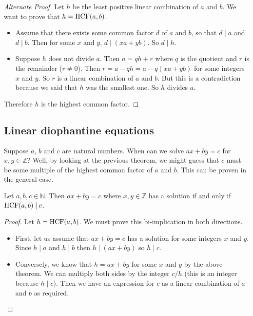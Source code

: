 \begin{proof}[Alternate Proof]
	Let \(h\) be the least positive linear combination of \(a\) and \(b\).
	We want to prove that \(h = \operatorname{HCF} (a, b)\).
	\begin{itemize}
		\item Assume that there exists some common factor \(d\) of \(a\) and \(b\), so that \(d\mid a\) and \(d\mid b\).
		      Then for some \(x\) and \(y\), \(d \mid (xa + yb)\).
		      So \(d \mid h\).
		\item Suppose \(h\) does not divide \(a\).
		      Then \(a = qh + r\) where \(q\) is the quotient and \(r\) is the remainder (\(r \neq 0\)).
		      Then \(r = a - qh = a - q(xa + yb)\) for some integers \(x\) and \(y\).
		      So \(r\) is a linear combination of \(a\) and \(b\).
		      But this is a contradiction because we said that \(h\) was the smallest one.
		      So \(h\) divides \(a\).
	\end{itemize}
	Therefore \(h\) is the highest common factor.
\end{proof}

\subsection{Linear diophantine equations}
Suppose \(a\), \(b\) and \(c\) are natural numbers.
When can we solve \(ax + by = c\) for \(x, y \in \mathbb Z\)?
Well, by looking at the previous theorem, we might guess that \(c\) must be some multiple of the highest common factor of \(a\) and \(b\).
This can be proven in the general case.
\begin{corollary}
	Let \(a, b, c \in \mathbb N\).
	Then \(ax + by = c\) where \(x, y \in \mathbb Z\) has a solution if and only if \(\operatorname{HCF}(a, b) \mid c\).
\end{corollary}
\begin{proof}
	Let \(h = \operatorname{HCF}(a, b)\).
	We must prove this bi-implication in both directions.
	\begin{itemize}
		\item First, let us assume that \(ax+by=c\) has a solution for some integers \(x\) and \(y\).
		      Since \(h \mid a\) and \(h \mid b\) then \(h \mid (ax+by)\) so \(h \mid c\).
		\item Conversely, we know that \(h = ax + by\) for some \(x\) and \(y\) by the above theorem.
		      We can multiply both sides by the integer \(c/h\) (this is an integer because \(h \mid c\)).
		      Then we have an expression for \(c\) as a linear combination of \(a\) and \(b\) as required.
	\end{itemize}
\end{proof}

